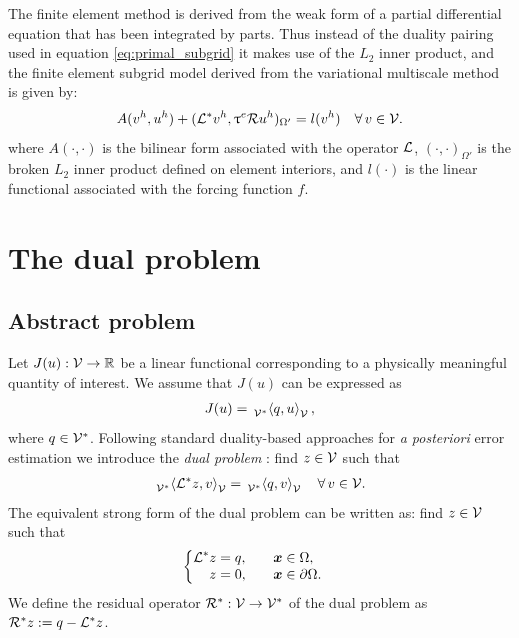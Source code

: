 \begin{rmk}
The finite element method is derived from the weak
form of a partial differential equation that has
been integrated by parts. Thus instead
of the duality pairing used in equation \eqref{eq:primal_subgrid}
it makes use of the $L_2$ inner product, and the finite
element subgrid model derived from the variational
multiscale method is given by:
%
\begin{gather}
A(v^h, u^h) + (\mathcal{L}^* v^h, \uptau^e \mathcal{R} u^h)_{\Omega'} = l(v^h)
\quad \forall \, v \in \mathcal{V}.
\label{eq:primal_fem}
\end{gather}
%
where $A(\cdot, \cdot)$ is the bilinear form associated with
the operator $\mathcal{L}$, $(\cdot, \cdot)_{\Omega'}$ is the broken
$L_2$ inner product defined on element interiors, and
$l(\cdot)$ is the linear functional associated with the forcing
function $f$.
\end{rmk}

\section{The dual problem}

\subsection{Abstract problem}

Let $J(u) : \mathcal{V} \to \mathbb{R}$ be a linear functional
corresponding to a physically meaningful quantity of
interest. We assume that $J(u)$ can be expressed as
%
\begin{gather}
J(u) = \,{}_{\mathcal{V}^*}^{}\!\left< {q}, {u} \right>_{\mathcal{V}},
\label{eq:functional}
\end{gather}
%
where $q \in \mathcal{V}^*$. Following standard duality-based
approaches for \emph{a posteriori} error estimation
\cite{bangerth2013adaptive, becker2001optimal,
eriksson1995introduction, fidkowski2011review}
we introduce the \emph{dual problem} : find $z \in \mathcal{V}$
such that
%
\begin{gather}
\,{}_{\mathcal{V}^*}^{}\!\left< {\mathcal{L}^* z}, {v} \right>_{\mathcal{V}} = \,{}_{\mathcal{V}^*}^{}\!\left< {q}, {v} \right>_{\mathcal{V}}
\quad \forall \, v \in \mathcal{V}.
\label{eq:dual_weak}
\end{gather}
%
The equivalent strong form of the dual problem can be written
as: find $z \in \mathcal{V}$ such that
%
\begin{gather}
\begin{cases}
\begin{aligned}
\mathcal{L}^* z &= q, \quad & & \boldsymbol{x} \in \Omega, \\
z &= 0, \quad & & \boldsymbol{x} \in \partial \Omega.
\end{aligned}
\end{cases}
\label{eq:dual_pde}
\end{gather}
%
We define the residual operator
$\mathcal{R}^* : \mathcal{V} \to \mathcal{V}^*$ of the dual problem as
$\mathcal{R}^* z := q - \mathcal{L}^* z$.

